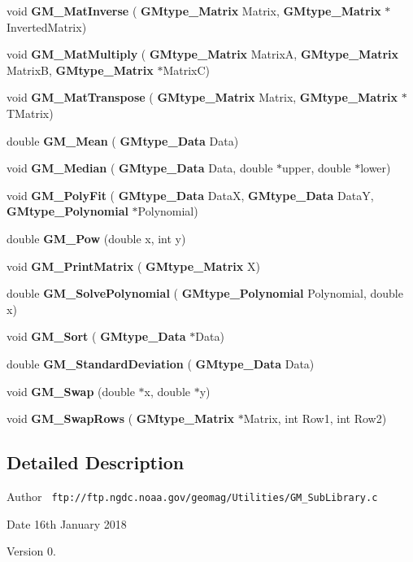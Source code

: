 \begin{DoxyCompactItemize}
void {\bfseries G\+M\+\_\+\+Mat\+Inverse} (\textbf{ G\+Mtype\+\_\+\+Matrix} Matrix, \textbf{ G\+Mtype\+\_\+\+Matrix} $\ast$Inverted\+Matrix)
\item 
\mbox{\label{_g_m___sub_library_8c_a5ca54f057c7addd0e545337f1bf7d821}} 
void {\bfseries G\+M\+\_\+\+Mat\+Multiply} (\textbf{ G\+Mtype\+\_\+\+Matrix} MatrixA, \textbf{ G\+Mtype\+\_\+\+Matrix} MatrixB, \textbf{ G\+Mtype\+\_\+\+Matrix} $\ast$MatrixC)
\item 
\mbox{\label{_g_m___sub_library_8c_a37adcb80b41c46b08169ca149dce7ee3}} 
void {\bfseries G\+M\+\_\+\+Mat\+Transpose} (\textbf{ G\+Mtype\+\_\+\+Matrix} Matrix, \textbf{ G\+Mtype\+\_\+\+Matrix} $\ast$T\+Matrix)
\item 
\mbox{\label{_g_m___sub_library_8c_aceba6e2c0e103b7f8d277b387e7234a3}} 
double {\bfseries G\+M\+\_\+\+Mean} (\textbf{ G\+Mtype\+\_\+\+Data} Data)
\item 
\mbox{\label{_g_m___sub_library_8c_a576a9afd0c22847a30eaf1df0b021ae5}} 
void {\bfseries G\+M\+\_\+\+Median} (\textbf{ G\+Mtype\+\_\+\+Data} Data, double $\ast$upper, double $\ast$lower)
\item 
\mbox{\label{_g_m___sub_library_8c_a9d88e0ea3cf8394eacbe1d1c1ffa8061}} 
void {\bfseries G\+M\+\_\+\+Poly\+Fit} (\textbf{ G\+Mtype\+\_\+\+Data} DataX, \textbf{ G\+Mtype\+\_\+\+Data} DataY, \textbf{ G\+Mtype\+\_\+\+Polynomial} $\ast$Polynomial)
\item 
\mbox{\label{_g_m___sub_library_8c_ae572acd489badbde919d29cebdc8a085}} 
double {\bfseries G\+M\+\_\+\+Pow} (double x, int y)
\item 
\mbox{\label{_g_m___sub_library_8c_a5d0b4d5450dad63803d8508def00b6bb}} 
void {\bfseries G\+M\+\_\+\+Print\+Matrix} (\textbf{ G\+Mtype\+\_\+\+Matrix} X)
\item 
\mbox{\label{_g_m___sub_library_8c_a8928b353f45bff0510f2c48e690c0e1f}} 
double {\bfseries G\+M\+\_\+\+Solve\+Polynomial} (\textbf{ G\+Mtype\+\_\+\+Polynomial} Polynomial, double x)
\item 
\mbox{\label{_g_m___sub_library_8c_a9e1ef0c53419ef9d5b42f7e284568fe9}} 
void {\bfseries G\+M\+\_\+\+Sort} (\textbf{ G\+Mtype\+\_\+\+Data} $\ast$Data)
\item 
\mbox{\label{_g_m___sub_library_8c_ab4f9c1bd94e04fdaeff1f8f36c403c40}} 
double {\bfseries G\+M\+\_\+\+Standard\+Deviation} (\textbf{ G\+Mtype\+\_\+\+Data} Data)
\item 
\mbox{\label{_g_m___sub_library_8c_acb1a586833a324081118a244315c7a0e}} 
void {\bfseries G\+M\+\_\+\+Swap} (double $\ast$x, double $\ast$y)
\item 
\mbox{\label{_g_m___sub_library_8c_a4be338552acd0a3f39bb1892f84ebc77}} 
void {\bfseries G\+M\+\_\+\+Swap\+Rows} (\textbf{ G\+Mtype\+\_\+\+Matrix} $\ast$Matrix, int Row1, int Row2)
\end{DoxyCompactItemize}


\subsection{Detailed Description}
\begin{DoxyAuthor}{Author}
{\texttt{ ftp\+://ftp.\+ngdc.\+noaa.\+gov/geomag/\+Utilities/\+G\+M\+\_\+\+Sub\+Library.\+c}} 
\end{DoxyAuthor}
\begin{DoxyDate}{Date}
16th January 2018 
\end{DoxyDate}
\begin{DoxyVersion}{Version}
0. 
\end{DoxyVersion}
